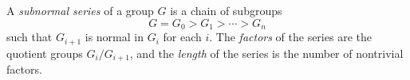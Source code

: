 A \emph{subnormal series} of a group $G$ is a chain of subgroups
$$G = G_0 > G_1 > \cdots > G_n$$
such that $G_{i+1}$ is normal in $G_i$ for each $i$. The \emph{factors} of the series are the quotient groups $G_i/G_{i+1}$, and the \emph{length} of the series is the number of nontrivial factors.
